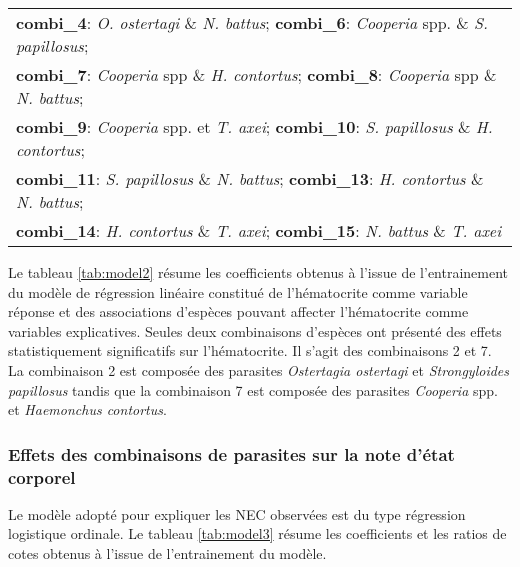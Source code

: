 \begin{table}[!ht]
\begin{tabular}{lcccc}
		\multicolumn{5}{l}{\textbf{combi\_4}: \textit{O. ostertagi} \& \textit{N. battus}; \textbf{combi\_6}: \textit{Cooperia} spp. \& \textit{S. papillosus};} \\
		\multicolumn{5}{l}{\textbf{combi\_7}: \textit{Cooperia} spp \& \textit{H. contortus}; \textbf{combi\_8}: \textit{Cooperia} spp \& \textit{N. battus};} \\
		\multicolumn{5}{l}{\textbf{combi\_9}: \textit{Cooperia} spp. et \textit{T. axei}; \textbf{combi\_10}: \textit{S. papillosus} \& \textit{H. contortus};} \\
		\multicolumn{5}{l}{\textbf{combi\_11}: \textit{S. papillosus} \& \textit{N. battus};
		\textbf{combi\_13}: \textit{H. contortus} \& \textit{N. battus};} \\
		\multicolumn{5}{l}{\textbf{combi\_14}: \textit{H. contortus} \& \textit{T. axei}; \textbf{combi\_15}: \textit{N. battus} \& \textit{T. axei}} \\
		\bottomrule
	\end{tabular}	
\end{table}

Le tableau \ref{tab:model2} résume les coefficients obtenus à l'issue de l'entrainement du modèle de régression linéaire constitué de l'hématocrite comme variable réponse et des associations d'espèces pouvant affecter l'hématocrite comme variables explicatives.
Seules deux combinaisons d'espèces ont présenté des effets statistiquement significatifs sur l'hématocrite. Il s'agit des combinaisons 2 et 7. La combinaison 2 est composée des parasites \textit{Ostertagia ostertagi} et \textit{Strongyloides papillosus} tandis que la combinaison 7 est composée des parasites \textit{Cooperia} spp. et \textit{Haemonchus contortus}.

\subsubsection{Effets des combinaisons de parasites sur la note d'état corporel}

Le modèle adopté pour expliquer les NEC observées est du type régression logistique ordinale. Le tableau \ref{tab:model3} résume les coefficients et les ratios de cotes obtenus à l'issue de l'entrainement du modèle.


